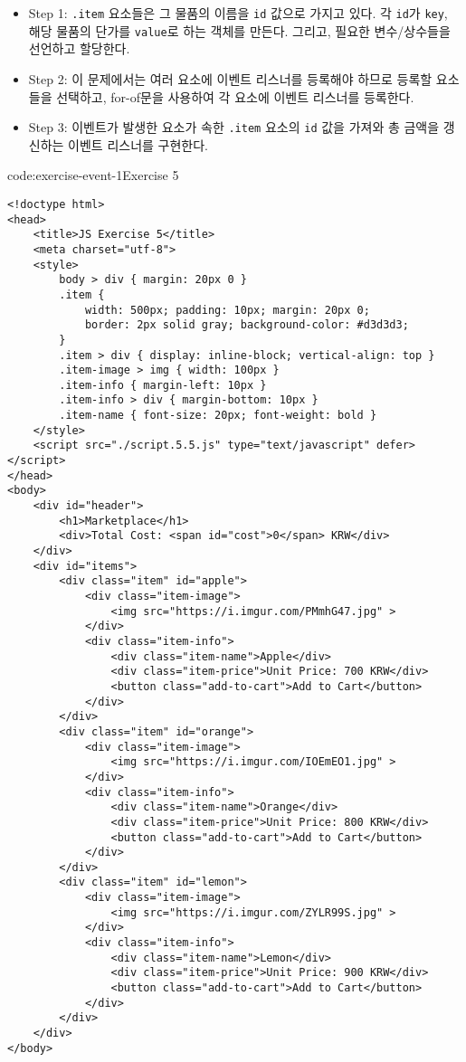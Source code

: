 \begin{itemize}
    \item Step 1: \texttt{.item} 요소들은 그 물품의 이름을 \texttt{id} 값으로 가지고 있다. 각 \texttt{id}가 \texttt{key}, 해당 물품의 단가를 \texttt{value}로 하는 객체를 만든다. 그리고, 필요한 변수/상수들을 선언하고 할당한다.
    \item Step 2: 이 문제에서는 여러 요소에 이벤트 리스너를 등록해야 하므로 등록할 요소들을 선택하고, for-of문을 사용하여 각 요소에 이벤트 리스너를 등록한다.
    \item Step 3: 이벤트가 발생한 요소가 속한 \texttt{.item} 요소의 \texttt{id} 값을 가져와 총 금액을 갱신하는 이벤트 리스너를 구현한다.
\end{itemize}
\newpage

\begin{codeenv}{code:exercise-event-1}{Exercise 5}\begin{verbatim}
<!doctype html>
<head>
    <title>JS Exercise 5</title>
    <meta charset="utf-8">
    <style>
        body > div { margin: 20px 0 }
        .item { 
            width: 500px; padding: 10px; margin: 20px 0;
            border: 2px solid gray; background-color: #d3d3d3;
        }
        .item > div { display: inline-block; vertical-align: top }
        .item-image > img { width: 100px }
        .item-info { margin-left: 10px }
        .item-info > div { margin-bottom: 10px }
        .item-name { font-size: 20px; font-weight: bold }
    </style>
    <script src="./script.5.5.js" type="text/javascript" defer></script>
</head>
<body>
    <div id="header">
        <h1>Marketplace</h1>
        <div>Total Cost: <span id="cost">0</span> KRW</div>
    </div>
    <div id="items">
        <div class="item" id="apple">
            <div class="item-image">
                <img src="https://i.imgur.com/PMmhG47.jpg" >
            </div>
            <div class="item-info">
                <div class="item-name">Apple</div>
                <div class="item-price">Unit Price: 700 KRW</div>
                <button class="add-to-cart">Add to Cart</button>
            </div>
        </div>
        <div class="item" id="orange">
            <div class="item-image">
                <img src="https://i.imgur.com/IOEmEO1.jpg" >
            </div>
            <div class="item-info">
                <div class="item-name">Orange</div>
                <div class="item-price">Unit Price: 800 KRW</div>
                <button class="add-to-cart">Add to Cart</button>
            </div>
        </div>
        <div class="item" id="lemon">
            <div class="item-image">
                <img src="https://i.imgur.com/ZYLR99S.jpg" >
            </div>
            <div class="item-info">
                <div class="item-name">Lemon</div>
                <div class="item-price">Unit Price: 900 KRW</div>
                <button class="add-to-cart">Add to Cart</button>
            </div>
        </div>
    </div>
</body>
\end{verbatim}
\end{codeenv}

